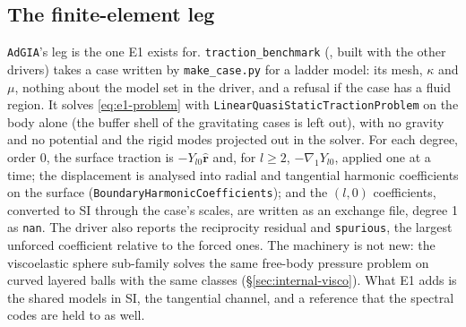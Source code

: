 \documentclass[11pt]{article}
\numberwithin{equation}{section}
\newcommand{\rhat}{\hat{\mathbf{r}}}
\newcommand{\code}[1]{\texttt{#1}}
\newcommand{\gradone}{\nabla_{1}}
\begin{document}
\subsection{The finite-element leg}
\label{sec:e1-fe}

\code{AdGIA}'s leg is the one E1 exists for. \code{traction\_benchmark}
(, built with the
other drivers) takes a case written by \code{make\_case.py} for a ladder
model: its mesh, $\kappa$ and $\mu$, nothing about the model set in the
driver, and a refusal if the case has a fluid region. It solves
\eqref{eq:e1-problem} with \code{LinearQuasiStaticTractionProblem} on the
body alone (the buffer shell of the gravitating cases is left out), with no
gravity and no potential and the rigid modes projected out in the solver.
For each degree, order 0, the surface traction is $-Y_{l0}\rhat$ and, for
$l\ge2$, $-\gradone Y_{l0}$, applied one at a time; the displacement is
analysed into radial and tangential harmonic coefficients on the surface
(\code{BoundaryHarmonicCoefficients}); and the $(l,0)$ coefficients,
converted to SI through the case's scales, are written as an exchange file,
degree 1 as \code{nan}. The driver also reports the reciprocity residual
and \code{spurious}, the largest unforced coefficient relative to the
forced ones. The machinery is not new: the viscoelastic sphere sub-family
solves the same free-body pressure problem on curved layered balls with the
same classes (\S\ref{sec:internal-visco}). What E1 adds is the shared models
in SI, the tangential channel, and a reference that the spectral codes are
held to as well.
\end{document}
